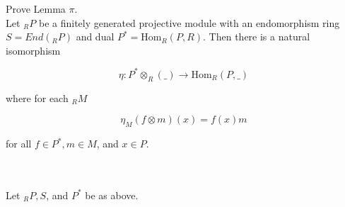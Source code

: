 Prove Lemma $\pi$.\\
Let $_RP$ be a finitely generated projective module with an endomorphism ring $S=End(_RP)$ and dual
$P^*=\text{Hom}_R(P,R)$. Then there is a natural isomorphism

$$\eta:P^*\otimes_R(\_)\to \text{Hom}_R(P,\_)$$

where for each $_RM$

$$\eta_M(f\otimes m)(x)=f(x)m$$

for all $f\in P^*, m\in M$, and $x\in P$.\\\\

\begin{solution}\renewcommand{\qedsymbol}{}\ \\
    Let $_RP, S$, and $P^*$ be as above.
\end{solution}